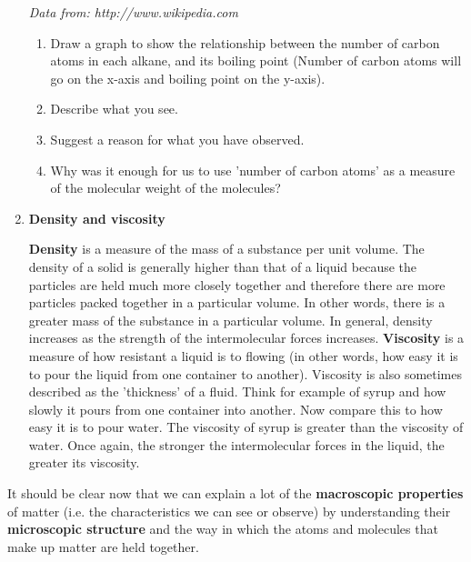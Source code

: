 \begin{enumerate}
{\begin{center}
\textit{Data from: http://www.wikipedia.com}
\end{center}

	\begin{enumerate}
	\item{Draw a graph to show the relationship between the number of carbon atoms in each alkane, and its boiling point (Number of carbon atoms will go on the x-axis and boiling point on the y-axis).}
	\item{Describe what you see.}
	\item{Suggest a reason for what you have observed.}
	\item{Why was it enough for us to use 'number of carbon atoms' as a measure of the molecular weight of the molecules?}
	\end{enumerate}


}


  \item{\textbf{Density and viscosity}} 

\textbf{Density} is a measure of the mass of a substance per unit volume. The density of a solid is generally higher than that of a liquid because the particles are held much more closely together and therefore there are more particles packed together in a particular volume. In other words, there is a greater mass of the substance in a particular volume. In general, density increases as the strength of the intermolecular forces increases. \textbf{Viscosity} is a measure of how resistant a liquid is to flowing (in other words, how easy it is to pour the liquid from one container to another). Viscosity is also sometimes described as the 'thickness' of a fluid. Think for example of syrup and how slowly it pours from one container into another. Now compare this to how easy it is to pour water. The viscosity of syrup is greater than the viscosity of water. Once again, the stronger the intermolecular forces in the liquid, the greater its viscosity.
\end{enumerate}

It should be clear now that we can explain a lot of the \textbf{macroscopic properties} of matter (i.e. the characteristics we can see or observe) by understanding their \textbf{microscopic structure} and the way in which the atoms and molecules that make up matter are held together. 



